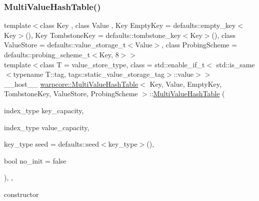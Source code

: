 \subsubsection{\texorpdfstring{Multi\+Value\+Hash\+Table()}{MultiValueHashTable()}\hspace{0.1cm}{\footnotesize\ttfamily [1/4]}}
{\footnotesize\ttfamily template$<$class Key , class Value , Key Empty\+Key = defaults\+::empty\+\_\+key$<$\+Key$>$(), Key Tombstone\+Key = defaults\+::tombstone\+\_\+key$<$\+Key$>$(), class Value\+Store  = defaults\+::value\+\_\+storage\+\_\+t$<$\+Value$>$, class Probing\+Scheme  = defaults\+::probing\+\_\+scheme\+\_\+t$<$\+Key, 8$>$$>$ \\
template$<$class T  = value\+\_\+store\+\_\+type, class  = std\+::enable\+\_\+if\+\_\+t$<$            std\+::is\+\_\+same$<$typename T\+::tag, tags\+::static\+\_\+value\+\_\+storage\+\_\+tag$>$\+::value$>$$>$ \\
\+\_\+\+\_\+host\+\_\+\+\_\+ \hyperlink{classwarpcore_1_1MultiValueHashTable}{warpcore\+::\+Multi\+Value\+Hash\+Table}$<$ Key, Value, Empty\+Key, Tombstone\+Key, Value\+Store, Probing\+Scheme $>$\+::\hyperlink{classwarpcore_1_1MultiValueHashTable}{Multi\+Value\+Hash\+Table} (\begin{DoxyParamCaption}\item[{index\+\_\+type}]{key\+\_\+capacity,  }\item[{index\+\_\+type}]{value\+\_\+capacity,  }\item[{key\+\_\+type}]{seed = {\ttfamily defaults\+:\+:seed$<$key\+\_\+type$>$()},  }\item[{bool}]{no\+\_\+init = {\ttfamily false} }\end{DoxyParamCaption})\hspace{0.3cm}{\ttfamily [inline]}, {\ttfamily [explicit]}, {\ttfamily [noexcept]}}



constructor 


